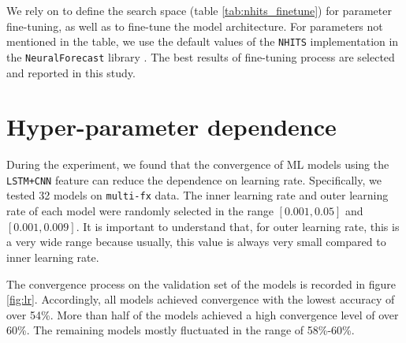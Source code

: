 \documentclass[aps,prb,groupedaddress,twocolumn,showpacs,dvipdfmx,superscriptaddress,pdftex]{revtex4-2}
\begin{document}
We rely on \cite{challu2023nhits} to define the search space (table \ref{tab:nhits_finetune}) for parameter fine-tuning, as well as to fine-tune the model architecture. For parameters not mentioned in the table, we use the default values of the \verb|NHITS| implementation in the \verb|NeuralForecast| library \cite{neuralforecast}. The best results of fine-tuning process are selected and reported in this study.

\section{Hyper-parameter dependence}
\label{app:lr}


During the experiment, we found that the convergence of ML models using the \verb|LSTM+CNN| feature can reduce the dependence on learning rate. Specifically, we tested 32 models on \verb|multi-fx| data. The inner learning rate and outer learning rate of each model were randomly selected in the range $[0.001, 0.05]$ and $[0.001, 0.009]$. It is important to understand that, for outer learning rate, this is a very wide range because usually, this value is always very small compared to inner learning rate.

\vspace{2mm}


The convergence process on the validation set of the models is recorded in figure \ref{fig:lr}. Accordingly, all models achieved convergence with the lowest accuracy of over 54\%. More than half of the models achieved a high convergence level of over 60\%. The remaining models mostly fluctuated in the range of 58\%-60\%.
\end{document}
